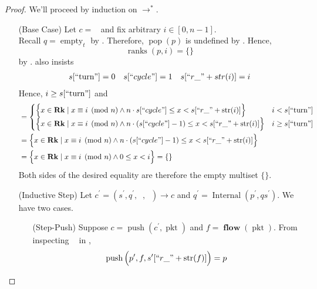 \documentclass{amsart}
\DeclareMathOperator{\pkt}{\mathrm{pkt}}
\DeclareMathOperator{\push}{\mathrm{push}}
\DeclareMathOperator{\pop}{\mathrm{pop}}
\DeclareMathOperator{\Rk}{\mathbf{Rk}}
\DeclareMathOperator{\Internal}{\mathrm{Internal}}
\DeclareMathOperator{\flow}{\mathbf{flow}}
\DeclareMathOperator{\zprepush}{z_{\mathrm{pre-push}}}
\DeclareMathOperator{\zpostpop}{z_{\mathrm{post-pop}}}
\DeclareMathOperator{\crr}{c_{\text{RR}}}
\DeclareMathOperator{\emt}{\mathrm{empty}}
\DeclareMathOperator{\ranks}{\mathrm{ranks}}
\theoremstyle{definition}
\begin{document}
\begin{proof}
    We'll proceed by induction on $\to^\ast$.
    \begin{enumerate}
        \item[(Base Case)] Let $c = \crr$ and fix arbitrary $i \in [0, n - 1]$.\\
            Recall $q = \emt_t$ by . 
            Therefore, $\pop(p)$ is undefined by .
            Hence, $$\ranks(p, i) = \{\}$$ by .
             also insists
            \begin{align*}
                s[``\text{turn}"] = 0
                &&
                s[``cycle"] = 1
                &&
                s[``r\_" + str(i)] = i
            \end{align*}
            Hence, $i \geq s[``\text{turn}"]$ and
            \begin{align*}
                &=
                \begin{cases}
                    \Big\{x \in \Rk \mid x \equiv i \pmod n \land n \cdot s[``cycle"] \leq x < s[``r\_" + \mathrm{str}(i)] \Big\} 
                    & i < s[``\text{turn}"]\\
                    \Big\{x \in \Rk \mid x \equiv i \pmod n \land n \cdot (s[``cycle"] - 1) \leq x < s[``r\_" + \mathrm{str}(i)]\Big\} 
                    & i \geq s[``\text{turn}"]
                \end{cases}\\
                &= \Big\{x \in \Rk \mid x \equiv i \pmod n \land n \cdot (s[``cycle"] - 1) \leq x < s[``r\_" + \mathrm{str}(i)]\Big\}\\
                &= \Big\{x \in \Rk \mid x \equiv i \pmod n \land 0 \leq x < i \Big\} = \{\}
            \end{align*}
            Both sides of the desired equality are therefore the empty multiset $\{\}$.
        \item[(Inductive Step)] Let $c^\prime = (s^\prime, q^\prime, \zprepush, \zpostpop) \to c$ and $q^\prime = \Internal(p^\prime, qs^\prime)$.
            We have two cases.
            \begin{enumerate}
                \item[(Step-Push)] Suppose $c = \push(c^\prime, \pkt)$ and $f = \flow(\pkt)$.
                    From inspecting $\zprepush$ in ,
                    \begin{align*}
                        \push\Big(p^\prime, f, s^\prime[``r\_" + \mathrm{str}(f)]\Big) = p

\end{align*}
\end{enumerate}
\end{enumerate}
\end{proof}
\end{document}
